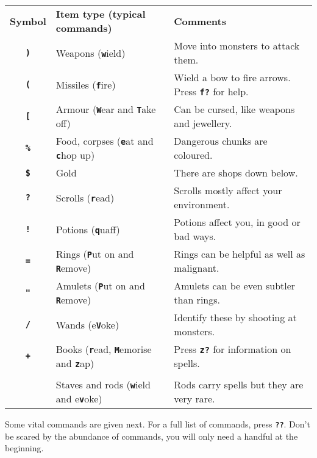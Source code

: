 \documentclass[a4paper,10pt]{article}
\newcommand{\key}[1]{{{\texttt{\textbf{#1}}}}} %
\newcommand{\sex}[1]{{{\textbf{#1}}}} %
\newcommand{\para}{\vspace{1.5ex}}
\begin{document}
\begin{tabular}{cll}
\sex{Symbol} & \sex{Item type (typical commands)} & \sex{Comments} \\
\key{)}  & Weapons (\key{w}ield)                  & Move into monsters to attack them.\\
\key{(}  & Missiles (\key{f}ire)                  & Wield a bow to fire arrows. Press \key{f?} for help.\\ 
\key{[}  & Armour (\key{W}ear and \key{T}ake off) & Can be cursed, like weapons and jewellery. \\
\key{\%} & Food, corpses (\key{e}at and \key{c}hop up) & Dangerous chunks are coloured. \\
\key{\$} & Gold                                   & There are shops down below. \\
\key{?}  & Scrolls (\key{r}ead)                   & Scrolls mostly affect your environment.\\
\key{!}  & Potions (\key{q}uaff)                  & Potions affect you, in good or bad ways. \\
\key{=}  & Rings (\key{P}ut on and \key{R}emove)  & Rings can be helpful as well as malignant. \\
\key{"}  & Amulets (\key{P}ut on and \key{R}emove) & Amulets can be even subtler than rings. \\
\key{/}  & Wands (e\key{V}oke)                    & Identify these by shooting at monsters. \\
\key{+}  & Books (\key{r}ead, \key{M}emorise and \key{z}ap) & Press \key{z?} for information on spells.\\
\key{\char`\\} & Staves and rods (\key{w}ield and e\key{v}oke) \hspace{0.2em}
                                                  & Rods carry spells but they are very rare.
\end{tabular}

\para

Some vital commands are given next. For a full list of commands, press \key{??}.
Don't be scared by the abundance of commands, you will only need a handful at 
the beginning. 

\para
\end{document}
